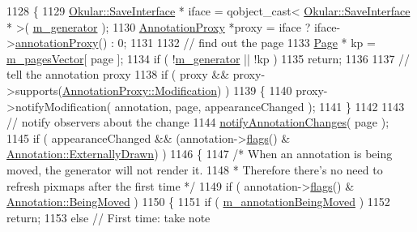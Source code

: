 \begin{DoxyCode}
1128 \{
1129     \hyperlink{classOkular_1_1SaveInterface}{Okular::SaveInterface} * iface = qobject\_cast< 
      \hyperlink{classOkular_1_1SaveInterface}{Okular::SaveInterface} * >( \hyperlink{classOkular_1_1DocumentPrivate_a52083f79ce95756ddea060e74315e91f}{m\_generator} );
1130     \hyperlink{classOkular_1_1AnnotationProxy}{AnnotationProxy} *proxy = iface ? iface->\hyperlink{classOkular_1_1SaveInterface_a1fdb82695d9758e9e68ab0129bf16237}{annotationProxy}() : 0;
1131 
1132     \textcolor{comment}{// find out the page}
1133     \hyperlink{classOkular_1_1Page}{Page} * kp = \hyperlink{classOkular_1_1DocumentPrivate_a73b852d9a73ffe8061b66dbf9b290f17}{m\_pagesVector}[ page ];
1134     \textcolor{keywordflow}{if} ( !\hyperlink{classOkular_1_1DocumentPrivate_a52083f79ce95756ddea060e74315e91f}{m\_generator} || !kp )
1135         \textcolor{keywordflow}{return};
1136 
1137     \textcolor{comment}{// tell the annotation proxy}
1138     \textcolor{keywordflow}{if} ( proxy && proxy->supports(\hyperlink{classOkular_1_1AnnotationProxy_ae89e16435aa7e10ac4089e673f44e543ac0cea5683bbb000686ad820c6cd885bf}{AnnotationProxy::Modification}) )
1139     \{
1140         proxy->notifyModification( annotation, page, appearanceChanged );
1141     \}
1142 
1143     \textcolor{comment}{// notify observers about the change}
1144     \hyperlink{classOkular_1_1DocumentPrivate_a1ca2b2788a81ae1bf852d5eab1de541c}{notifyAnnotationChanges}( page );
1145     \textcolor{keywordflow}{if} ( appearanceChanged && (annotation->\hyperlink{classOkular_1_1Annotation_a3d6f7ee5057155b90e76c24768880947}{flags}() & 
      \hyperlink{classOkular_1_1Annotation_a8a214541446745761efeda70b3a4302ea75f088f5533ace9d9d47a506b707f5a1}{Annotation::ExternallyDrawn}) )
1146     \{
1147         \textcolor{comment}{/* When an annotation is being moved, the generator will not render it.}
1148 \textcolor{comment}{         * Therefore there's no need to refresh pixmaps after the first time */}
1149         \textcolor{keywordflow}{if} ( annotation->\hyperlink{classOkular_1_1Annotation_a3d6f7ee5057155b90e76c24768880947}{flags}() & \hyperlink{classOkular_1_1Annotation_a8a214541446745761efeda70b3a4302ea9cd51e0fe53aac93798a205e7fb5c04a}{Annotation::BeingMoved} )
1150         \{
1151             \textcolor{keywordflow}{if} ( \hyperlink{classOkular_1_1DocumentPrivate_a57c1dee8543960398669cb927fab17cc}{m\_annotationBeingMoved} )
1152                 \textcolor{keywordflow}{return};
1153             \textcolor{keywordflow}{else} \textcolor{comment}{// First time: take note}

\end{DoxyCode}
